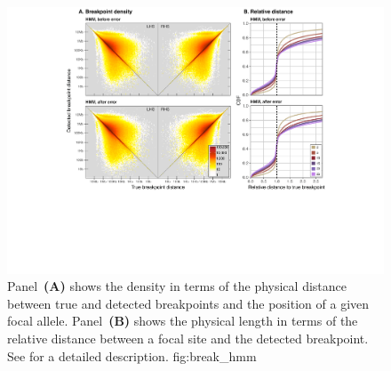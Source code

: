 

\begin{figure}[!htbp]
\includegraphics[width=\textwidth]{./img/ch4/break_hmm}
{Panel~\textbf{(A)} shows the density in terms of the physical distance between true and detected breakpoints and the position of a given focal allele.
Panel~\textbf{(B)} shows the physical length in terms of the relative distance between a focal site and the detected breakpoint.
See  for a detailed description.}
{fig:break_hmm}
\end{figure}

